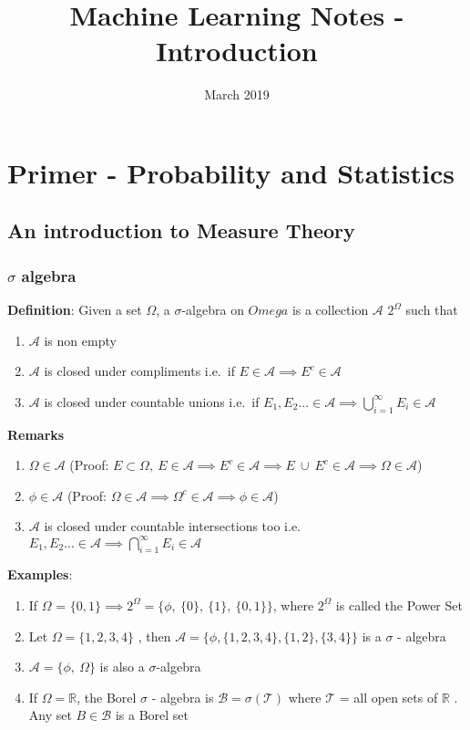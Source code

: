 \documentclass[12pt]{article}
\title{Machine Learning Notes - Introduction}
\author{}
\date{March 2019}
\begin{document}
\maketitle
\section{Primer - Probability and Statistics}

\subsection{An introduction to Measure Theory}
\subsubsection*{$\sigma$ algebra}
\textbf{Definition}: Given a set $\Omega$, a $\sigma$-algebra on $Omega$ is a collection $\mathcal{A}$  \subset \:  $2^{\Omega}$ such that 
\begin{enumerate}
    \item $\mathcal{A}$ is non empty 
    \item $\mathcal{A}$ is closed under compliments i.e.\ if $E \in \mathcal{A} \implies E^{c} \in \mathcal{A}$
    \item $\mathcal{A}$ is closed under countable unions i.e.\ if $E_{1}, E_{2}... \in \mathcal{A} \implies \bigcup\limits_{i=1}^{\infty} E_{i} \in \mathcal{A}$
\end{enumerate}
\textbf{Remarks}
\begin{enumerate}
    \item $\Omega \in \mathcal{A}$ \: (Proof: $E \subset \Omega , \: E \in \mathcal{A} \implies E^{c} \in \mathcal{A} \implies E \: \cup \: E^{c} \in \mathcal{A} \implies \Omega \in \mathcal{A}$)
    \item $\phi \in \mathcal{A}$ \: (Proof: $\Omega \in \mathcal{A} \implies \Omega^{c} \in \mathcal{A} \implies \phi \in \mathcal{A}$)
    \item $\mathcal{A}$ is closed under countable intersections too i.e. $E_{1}, E_{2}... \in \mathcal{A} \implies \bigcap\limits_{i=1}^{\infty} E_{i} \in \mathcal{A}$
\end{enumerate}
\textbf{Examples}:
\begin{enumerate}
    \item If $\Omega$ = $\{0,1\} \implies 2^{\Omega} = \{ \phi,\: \{0\},\: \{1\},\: \{0,1\} \}$, where $2^{\Omega}$ is called the Power Set
    \item Let $\Omega = \{1,2,3,4\}$ , then $\mathcal{A} = \{ \phi, \{1,2,3,4\}, \{1,2\} , \{3,4\}\}$ is a $\sigma$ - algebra 
    \item $\mathcal{A} = \{\phi,\: \Omega\}$ is also a $\sigma$-algebra
    \item If $\Omega = \mathbb{R}$, the Borel $\sigma$ - algebra is $\mathcal{B} = \sigma(\mathcal{T})$ where $\mathcal{T}$ = all open sets of $\mathbb{R}$ . Any set $B \in \mathcal{B}$ is a Borel set
\end{enumerate}
\newpage
\end{document}

